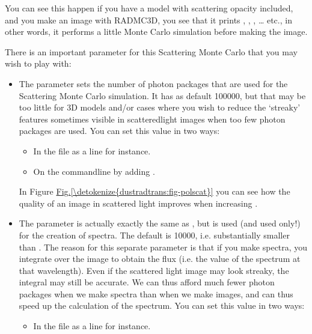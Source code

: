 \documentclass[letterpaper,10pt,english]{sphinxmanual}
\begin{document}
You can see this happen if you have a model with scattering opacity included,
and you make an image with RADMC\sphinxhyphen{}3D, you see that it prints , ,
, … etc., in other words, it performs a little Monte Carlo simulation
before making the image.

There is an important parameter for this Scattering Monte Carlo that you
may wish to play with:
\begin{itemize}
\item {} 

The parameter  sets the number of photon packages
that are used for the Scattering Monte Carlo simulation. It has as default
100000, but that may be too little for 3\sphinxhyphen{}D models and/or cases where you
wish to reduce the ‘streaky’ features sometimes visible in
scattered\sphinxhyphen{}light images when too few photon packages are used. You can
set this value in two ways:
\begin{itemize}
\item {} 
In the  file as a line  for instance.

\item {} 
On the command\sphinxhyphen{}line by adding .

\end{itemize}

In Figure \hyperref[\detokenize{dustradtrans:fig-polscat}]{Fig.\@ \ref{\detokenize{dustradtrans:fig-polscat}}} you can see how the quality of an image in
scattered light improves when increasing .

\item {} 

The parameter  is actually exactly the same as
, but is used (and used only!) for the creation of
spectra. The default is 10000, i.e. substantially smaller than .
The reason for this separate parameter is that if you make
spectra, you integrate over the image to obtain the flux (i.e. the value of
the spectrum at that wavelength). Even if the scattered light image may
look streaky, the integral may still be accurate. We can thus afford much
fewer photon packages when we make spectra than when we make images, and
can thus speed up the calculation of the spectrum. You can set this value
in two ways:
\begin{itemize}
\item {} 
In the  file as a line  for instance.


\end{itemize}
\end{itemize}
\end{document}
